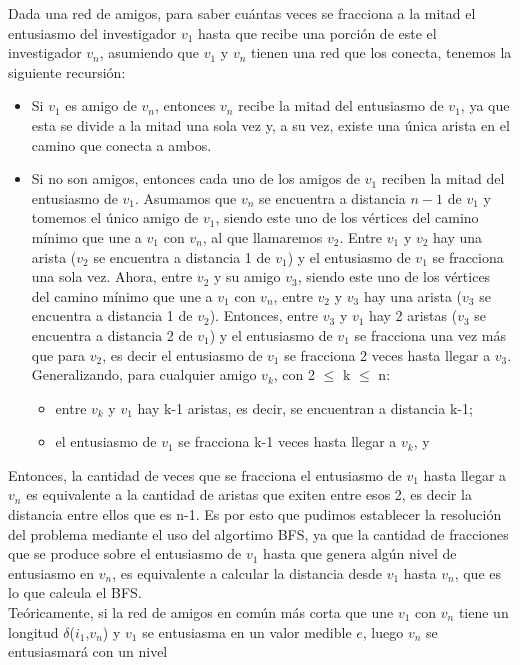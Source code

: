 \indent Dada una red de amigos, para saber cuántas veces se fracciona a la mitad
el entusiasmo del investigador $v_1$ hasta que recibe una porción de este el
investigador $v_n$, asumiendo que $v_1$ y $v_n$ tienen una red que los conecta,
tenemos la siguiente recursión:
\begin{itemize}
 \item Si $v_1$ es amigo de $v_n$, entonces $v_n$ recibe la mitad del entusiasmo
de $v_1$, 
 ya que esta se divide a la mitad una sola vez y, a su vez, existe una única
arista en el camino que conecta a ambos.
 \item Si no son amigos, entonces cada uno de los amigos de $v_1$ reciben la
mitad del 
 entusiasmo de $v_1$. Asumamos que $v_n$ se encuentra a distancia $n-1$ de $v_1$
y 
 tomemos el único amigo de $v_1$, siendo este
 uno de los vértices del camino mínimo que une a $v_1$ con $v_n$,
 al que llamaremos $v_2$. 
 Entre $v_1$ y $v_2$ hay una arista ($v_2$ se encuentra a distancia 1 de $v_1$)
y el
 entusiasmo de $v_1$ se fracciona una sola vez.
 Ahora, entre $v_2$ y su amigo $v_3$, siendo este
 uno de los vértices del camino mínimo que une a $v_1$ con $v_n$, entre $v_2$ y
$v_3$
 hay una arista ($v_3$ se encuentra a distancia 1 de $v_2$). Entonces, entre
$v_3$ y $v_1$ 
 hay 2 aristas ($v_3$ se encuentra a distancia 2 de $v_1$) y el
 entusiasmo de $v_1$ se fracciona una vez más que para $v_2$, es decir el
 entusiasmo de $v_1$ se fracciona 2 veces hasta llegar a $v_3$. Generalizando,
 para cualquier amigo $v_k$, con 2 $\leq$ k $\leq$ n:
 \begin{itemize}
  \item entre $v_k$ y $v_1$ hay k-1 aristas, es decir, se encuentran a distancia
k-1;
  \item el entusiasmo de $v_1$ se fracciona k-1 veces hasta llegar a $v_k$, y 
 \end{itemize}
\end{itemize}
\indent\indent Entonces, la cantidad de veces que se fracciona el entusiasmo de
$v_1$ hasta llegar a $v_n$ 
 es equivalente a la cantidad de aristas que exiten entre esos 2, es decir la
distancia entre ellos que es n-1.
 Es por esto que pudimos establecer la resolución del problema mediante
el uso del algortimo BFS, ya que la cantidad de fracciones que se produce sobre
el entusiasmo de $v_1$ hasta que genera algún nivel de entusiasmo en $v_n$, es
equivalente a calcular la distancia desde $v_1$ hasta $v_n$, que es lo que
calcula el BFS.\\

\indent Teóricamente, si la red de amigos en común más corta que
une $v_1$ con $v_n$ tiene un longitud $\delta$($i_1$,$v_n$) y $v_1$ se
entusiasma en un valor medible $e$,
luego $v_n$ se
entusiasmará con un nivel

